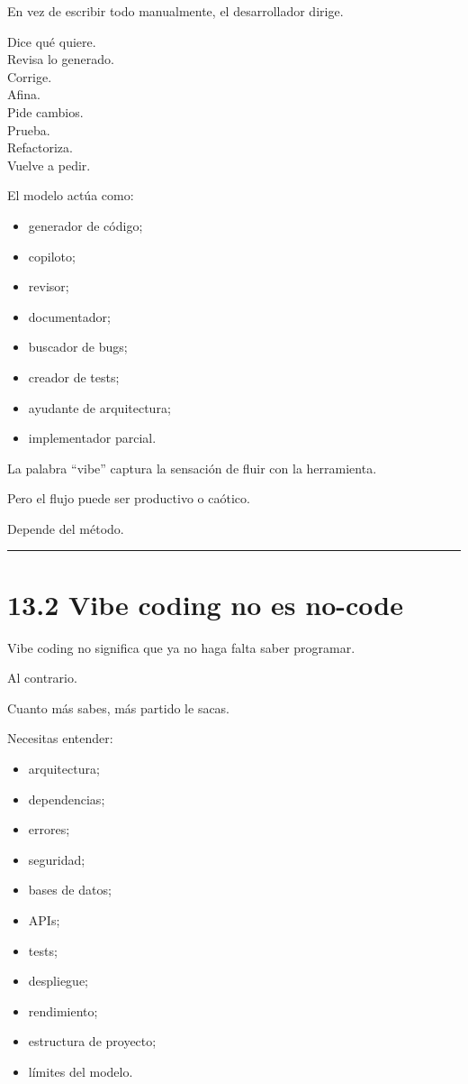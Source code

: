 En vez de escribir todo manualmente, el desarrollador dirige.

Dice qué quiere.\\
Revisa lo generado.\\
Corrige.\\
Afina.\\
Pide cambios.\\
Prueba.\\
Refactoriza.\\
Vuelve a pedir.

El modelo actúa como:

\begin{itemize}
\tightlist
\item
  generador de código;
\item
  copiloto;
\item
  revisor;
\item
  documentador;
\item
  buscador de bugs;
\item
  creador de tests;
\item
  ayudante de arquitectura;
\item
  implementador parcial.
\end{itemize}

La palabra ``vibe'' captura la sensación de fluir con la herramienta.

Pero el flujo puede ser productivo o caótico.

Depende del método.

\begin{center}\rule{0.5\linewidth}{0.5pt}\end{center}

\section{13.2 Vibe coding no es
no-code}\label{vibe-coding-no-es-no-code}

Vibe coding no significa que ya no haga falta saber programar.

Al contrario.

Cuanto más sabes, más partido le sacas.

Necesitas entender:

\begin{itemize}
\tightlist
\item
  arquitectura;
\item
  dependencias;
\item
  errores;
\item
  seguridad;
\item
  bases de datos;
\item
  APIs;
\item
  tests;
\item
  despliegue;
\item
  rendimiento;
\item
  estructura de proyecto;
\item
  límites del modelo.
\end{itemize}

